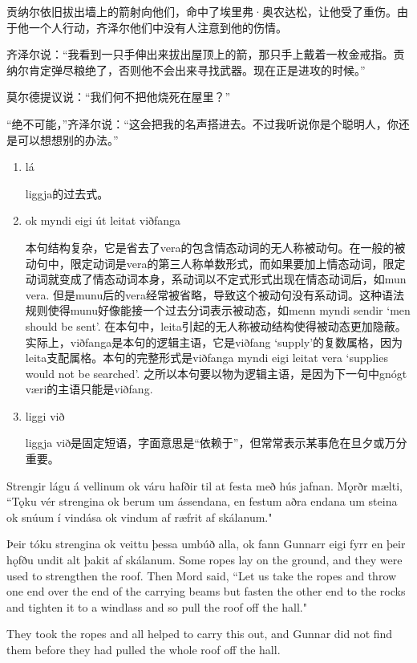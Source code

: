 \begin{translation*}{}
  贡纳尔依旧拔出墙上的箭射向他们，命中了埃里弗·奥农达松，让他受了重伤。由于他一个人行动，齐泽尔他们中没有人注意到他的伤情。

  齐泽尔说：“我看到一只手伸出来拔出屋顶上的箭，那只手上戴着一枚金戒指。贡纳尔肯定弹尽粮绝了，否则他不会出来寻找武器。现在正是进攻的时候。”

  莫尔德提议说：“我们何不把他烧死在屋里？”

  “绝不可能，”齐泽尔说：“这会把我的名声搭进去。不过我听说你是个聪明人，你还是可以想想别的办法。”
\end{translation*}
\begin{grammar*}{}
  \begin{enumerate}[leftmargin=*]
    \item lá

          liggja的过去式。
    \item ok myndi eigi út leitat viðfanga

          本句结构复杂，它是省去了vera的包含情态动词的无人称被动句。在一般的被动句中，限定动词是vera的第三人称单数形式，而如果要加上情态动词，限定动词就变成了情态动词本身，系动词以不定式形式出现在情态动词后，如mun vera. 但是munu后的vera经常被省略，导致这个被动句没有系动词。这种语法规则使得munu好像能接一个过去分词表示被动态，如menn myndi sendir `men should be sent'. 在本句中，leita引起的无人称被动结构使得被动态更加隐蔽。实际上，viðfanga是本句的逻辑主语，它是viðfang `supply'的复数属格，因为leita支配属格。本句的完整形式是viðfanga myndi eigi leitat vera `supplies would not be searched'. 之所以本句要以物为逻辑主语，是因为下一句中gnógt væri的主语只能是viðfang.

    \item liggi við

          liggja við是固定短语，字面意思是“依赖于”，但常常表示某事危在旦夕或万分重要。
  \end{enumerate}
\end{grammar*}
\begin{paracol}{2}
  Strengir lágu á vellinum ok váru hafðir til at festa með hús jafnan. Mǫrðr mælti, ``Tǫku vér strengina ok berum um ássendana, en festum aðra endana um steina ok snúum í vindása ok vindum af ræfrit af skálanum."

  Þeir tóku strengina ok veittu þessa umbúð alla, ok fann Gunnarr eigi fyrr en þeir hǫfðu undit alt þakit af skálanum.
  \switchcolumn
  Some ropes lay on the ground, and they were used to strengthen the roof. Then Mord said, ``Let us take the ropes and throw one end over the end of the carrying beams but fasten the other end to the rocks and tighten it to a windlass and so pull the roof off the hall."

  They took the ropes and all helped to carry this out, and Gunnar did not find them before they had pulled the whole roof off the hall.
\end{paracol}
